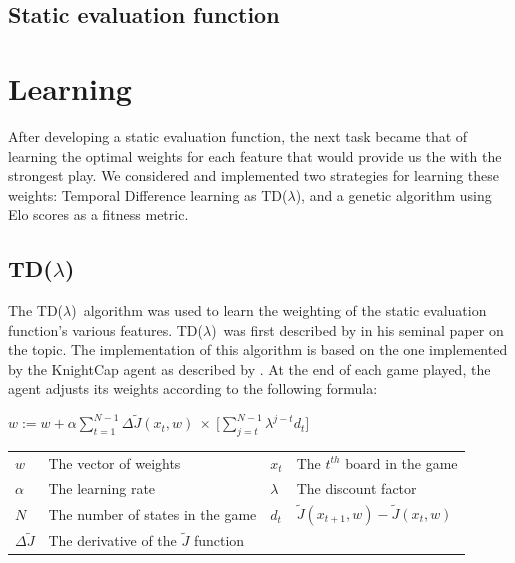 \documentclass[11pt]{article}
\newcommand{\tdl}{TD($\lambda$)}
\begin{document}
\subsection{Static evaluation function}
\label{sub:eval_func}

\section{Learning}
\label{sec:learning}

After developing a static evaluation function, the next task became that of
learning the optimal weights for each feature that would provide us the with
the strongest play. We considered and implemented two strategies for learning
these weights: Temporal Difference learning as \tdl, and a genetic algorithm
using Elo scores as a fitness metric.

\subsection{\tdl}
\label{sub:tdlambda}

The \tdl\ algorithm was used to learn the weighting of the static evaluation
function's various features. \tdl\ was first described by \citet{Sutton1988}
in his seminal paper on the topic. The implementation of this algorithm is
based on the one implemented by the KnightCap agent as described by
\citet{Baxter1997}.  At the end of each game played, the agent adjusts its
weights according to the following formula:

\begin{center}

    $\displaystyle w := w + \alpha \sum _{t=1} ^{N-1} \Delta \tilde{J}(x_t,w) \: \times \: \Big[ \sum ^ {N-1} _{j=t} \lambda^{j-t} d_t \Big] $\\
        
    \begin{tabular}{  l l | l l }
      $w$                   & The vector of weights                         &$x_t$  & The $t^{th}$ board in the game \\
      $\alpha$              & The learning rate                             &$\lambda$      &The discount factor \\
      $N$                   & The number of states in the game              &$d_t$          &$\tilde{J}(x_{t+1},w) - \tilde{J}(x_t,w)$\\
      $\Delta \tilde{J}$    & The derivative of the $\tilde{J}$ function    &               &\\
    \end{tabular}
\end{center}
\end{document}
